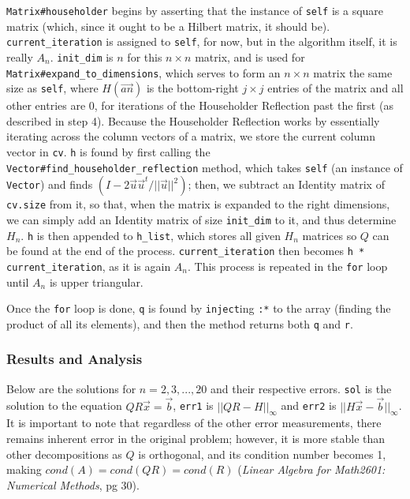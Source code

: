 \documentclass[letterpaper,12pt]{article}
\begin{document}
\texttt{Matrix\#householder} begins by asserting that the instance of
\texttt{self} is a square matrix (which, since it ought to be a Hilbert matrix,
it should be).
\texttt{current\_iteration} is assigned to \texttt{self}, for now, but in the
algorithm itself, it is really $A_n$.
\texttt{init\_dim} is $n$ for this $n \times n$ matrix, and is used for
\texttt{Matrix\#expand\_to\_dimensions}, which serves to form an $n \times n$
matrix the same size as \texttt{self}, where $H(\vec{a\textit{n}})$ is the bottom-right
$j \times j$ entries of the matrix and all other entries are 0, for iterations of the Householder
Reflection past the first (as described in step 4).
Because the Householder Reflection works by essentially iterating across the
column vectors of a matrix, we store the current column vector in \texttt{cv}.
\texttt{h} is found by first calling the \texttt{Vector\#find\_householder\_reflection}
method, which takes \texttt{self} (an instance of \texttt{Vector}) and finds $(I - 2\vec{u}\vec{u}^t / ||\vec{u}||^2)$;
then, we subtract an Identity matrix of \texttt{cv.size} from it, so that,
when the matrix is expanded to the right dimensions, we can simply add an
Identity matrix of size \texttt{init\_dim} to it, and thus determine
$H_n$.
\texttt{h} is then appended to \texttt{h\_list}, which stores all given
$H_n$ matrices so $Q$ can be found at the end of the process.
\texttt{current\_iteration} then becomes \texttt{h * current\_iteration},
as it is again $A_n$.
This process is repeated in the \texttt{for} loop until $A_n$ is upper triangular.

Once the \texttt{for} loop is done, \texttt{q} is found by \texttt{inject}ing \texttt{:*}
to the array (finding the product of all its elements), and then the method
returns both \texttt{q} and \texttt{r}.
\\
\subsubsection{Results and Analysis}

Below are the solutions for $n = 2,3,...,20$ and their respective errors.
\texttt{sol} is the solution to the equation $QR\vec{x}=\vec{b}$, \texttt{err1}
is $||QR - H||_{\infty}$ and \texttt{err2} is $||H\vec{x} - \vec{b}||_{\infty}$.
It is important to note that regardless of the other error measurements, there
remains inherent error in the original problem; however, it is more stable than
other decompositions as $Q$ is orthogonal, and its condition number becomes 1,
making $cond(A) = cond(QR) = cond(R)$ (\textit{Linear Algebra for Math2601: Numerical Methods}, pg 30).
\end{document}
